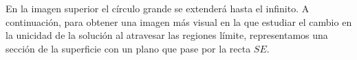 En la imagen superior el círculo grande se extenderá hasta el infinito. A continuación, para obtener una imagen más visual en la que estudiar el cambio en la unicidad de la solución al atravesar las regiones límite, representamos una sección de la superficie con un plano que pase por la recta $SE$.
\begin{figure}[H]
\centering
{}
\end{figure}
